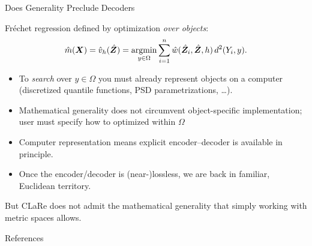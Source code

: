 \documentclass[compress]{beamer}
\newcommand{\argmin}{\ensuremath{\operatornamewithlimits{argmin}}}
\newcommand{\Frechet}{Fr\'echet}
\newcommand{\Zbold}{\bm{Z}}
\newcommand{\Xbold}{\bm{X}}
\begin{document}
\begin{frame}{Does Generality Preclude Decoders}

\Frechet{} regression defined by optimization {\em over objects}:
\[
\hat{m}(\Xbold) = \hat{v}_h(\hat{\Zbold})
= \argmin_{y \in \Omega} \sum_{i=1}^n \hat{w}(\hat{\Zbold}_i,\hat{\Zbold},h)\, d^2(Y_i,y).
\]

\begin{itemize}
\item To {\em search} over $y \in \Omega$ you must already represent objects on a computer (discretized quantile functions, PSD parametrizations, \dots).

\item Mathematical generality does not circumvent object-specific implementation; user must specify how to optimized within $\Omega$

\item Computer representation means explicit encoder--decoder is available in principle. 

\item Once the encoder/decoder is (near-)lossless, we are back in familiar, Euclidean territory. 
\end{itemize}


But CLaRe does not admit the mathematical generality that simply working with metric spaces allows.  

\end{frame}


\begin{frame}{References}
    
\end{frame}
\end{document}
